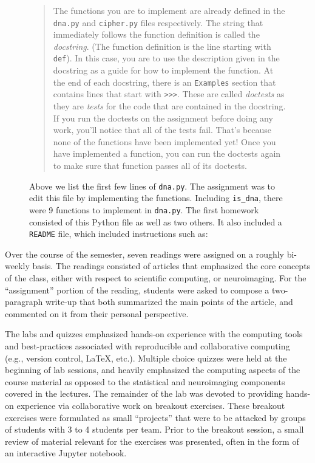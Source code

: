 \begin{figure}
\centering

\caption{Above we list the first few lines of \texttt{dna.py}.
The assignment was to edit this file by implementing the functions.
Including \texttt{is\_dna}, there were 9 functions
to implement in \texttt{dna.py}.
The first homework consisted of this Python file as well as two others.
It also included a \texttt{README} file, which included instructions
such as:}\label{fig:dna}
\begin{quotation}
The functions you are to implement are already defined in the \texttt{dna.py} and
\texttt{cipher.py} files respectively. The string that immediately follows the function
definition is called the \emph{docstring}. (The function definition is the line
starting with \texttt{def}). In this case, you are to use the description given in the
docstring as a guide for how to implement the function. At the end of each
docstring, there is an \texttt{Examples} section that contains lines that start with
\verb|>>>|. These are called \emph{doctests} as they are \emph{tests} for the code that are
contained in the docstring. If you run the doctests on the assignment before
doing any work, you'll notice that all of the tests fail. That's because none
of the functions have been implemented yet! Once you have implemented a
function, you can run the doctests again to make sure that function passes all
of its doctests.
\end{quotation}
\end{figure}

Over the course of the semester, seven readings were assigned on a roughly
bi-weekly basis.
The readings consisted of articles that emphasized the core concepts
of the class, either with respect to scientific computing, or neuroimaging.
For the ``assignment'' portion of the reading, students were asked to compose
a two-paragraph write-up that both summarized the main points of the article,
and commented on it from their personal perspective.

The labs and quizzes emphasized hands-on 
experience with the computing tools and best-practices associated with
reproducible and collaborative computing (e.g., version control, \LaTeX, etc.).
Multiple choice quizzes were held at the beginning of lab sessions, and heavily
emphasized the computing aspects of the course material as
opposed to the statistical and neuroimaging components covered in the lectures.
The remainder of the lab was devoted to providing hands-on experience via
collaborative work on breakout exercises.
These breakout exercises were formulated as small ``projects'' that were to be
attacked by groups of students with 3 to 4 students per team.
Prior to the breakout session, a small review of material relevant for the 
exercises was presented, often in the form of an interactive Jupyter notebook.

